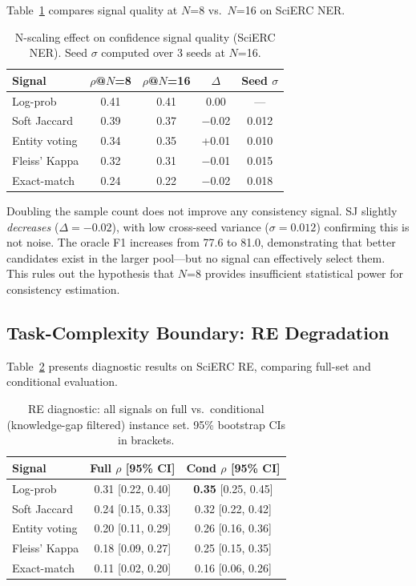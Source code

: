 \documentclass[11pt,a4paper]{article}
\begin{document}
Table~\ref{tab:n_scaling} compares signal quality at $N$=8 vs.\ $N$=16 on SciERC NER.

\begin{table}[t]
\centering
\small
\caption{N-scaling effect on confidence signal quality (SciERC NER). Seed $\sigma$ computed over 3 seeds at $N$=16.}
\label{tab:n_scaling}
\begin{tabular}{lcccc}
\toprule
Signal & $\rho$@$N$=8 & $\rho$@$N$=16 & $\Delta$ & Seed $\sigma$ \\
\midrule
Log-prob      & 0.41 & 0.41 & 0.00 & --- \\
Soft Jaccard  & 0.39 & 0.37 & $-$0.02 & 0.012 \\
Entity voting & 0.34 & 0.35 & +0.01 & 0.010 \\
Fleiss' Kappa & 0.32 & 0.31 & $-$0.01 & 0.015 \\
Exact-match   & 0.24 & 0.22 & $-$0.02 & 0.018 \\
\bottomrule
\end{tabular}
\end{table}

Doubling the sample count does not improve any consistency signal. SJ slightly \emph{decreases} ($\Delta=-0.02$), with low cross-seed variance ($\sigma=0.012$) confirming this is not noise. The oracle F1 increases from 77.6 to 81.0, demonstrating that better candidates exist in the larger pool---but no signal can effectively select them. This rules out the hypothesis that $N$=8 provides insufficient statistical power for consistency estimation.

\subsection{Task-Complexity Boundary: RE Degradation}

Table~\ref{tab:re_diagnostic} presents diagnostic results on SciERC RE, comparing full-set and conditional evaluation.

\begin{table}[t]
\centering
\small
\caption{RE diagnostic: all signals on full vs.\ conditional (knowledge-gap filtered) instance set. 95\% bootstrap CIs in brackets.}
\label{tab:re_diagnostic}
\begin{tabular}{lcc}
\toprule
Signal & Full $\rho$ [95\% CI] & Cond $\rho$ [95\% CI] \\
\midrule
Log-prob      & 0.31 [0.22, 0.40] & \textbf{0.35} [0.25, 0.45] \\
Soft Jaccard  & 0.24 [0.15, 0.33] & 0.32 [0.22, 0.42] \\
Entity voting & 0.20 [0.11, 0.29] & 0.26 [0.16, 0.36] \\
Fleiss' Kappa & 0.18 [0.09, 0.27] & 0.25 [0.15, 0.35] \\
Exact-match   & 0.11 [0.02, 0.20] & 0.16 [0.06, 0.26] \\
\bottomrule
\end{tabular}
\end{table}
\end{document}
